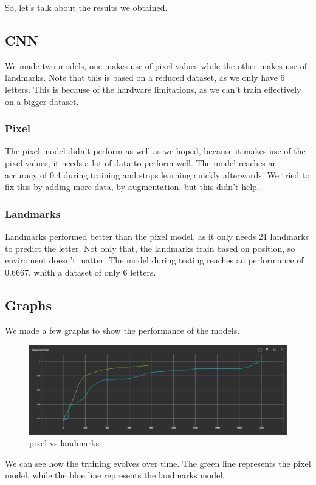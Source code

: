 \documentclass[../paper.tex]{subfiles}
\begin{document}
    So, let's talk about the results we obtained.
    \subsection{CNN}
    We made two models, one makes use of pixel values while the other makes use of landmarks.
    Note that this is based on a reduced dataset, as we only have 6 letters.
    This is because of the hardware limitations, as we can't train effectively on a bigger dataset.
    \subsubsection{Pixel}
    The pixel model didn't perform as well as we hoped, because it makes use of the pixel values, it needs a lot of data to perform well.
    The model reaches an accuracy of 0.4 during training and stops learning quickly afterwards.
    We tried to fix this by adding more data, by augmentation, but this didn't help.
    \subsubsection{Landmarks}
    Landmarks performed better than the pixel model, as it only needs 21 landmarks to predict the letter.
    Not only that, the landmarks train based on position, so enviroment doesn't matter.
    The model during testing reaches an performance of 0.6667, whith a dataset of only 6 letters.
    \subsection{Graphs}
    We made a few graphs to show the performance of the models.
    \begin{figure}[h]
        \centering
        \includegraphics[width=\linewidth]{best_models}
        \caption{pixel vs landmarks}
        \label{fig:pixel_vs_landmarks}
    \end{figure}
    We can see how the training evolves over time. 
    The green line represents the pixel model, while the blue line represents the landmarks model.
\end{document}
